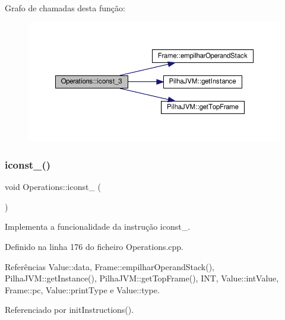 Grafo de chamadas desta função\+:
\nopagebreak
\begin{figure}[H]
\begin{center}
\leavevmode
\includegraphics[width=350pt]{classOperations_ab8466864c000152e75172b623704f610_cgraph}
\end{center}
\end{figure}
\mbox{\label{classOperations_a5fad2dad3d79c889728a6687f36e1192}} 
\subsubsection{\texorpdfstring{iconst\+\_()}{iconst\_4()}}
{\footnotesize\ttfamily void Operations\+::iconst\+\_ (\begin{DoxyParamCaption}{ }\end{DoxyParamCaption})\hspace{0.3cm}{\ttfamily [private]}}



Implementa a funcionalidade da instrução iconst\+\_. 



Definido na linha 176 do ficheiro Operations.\+cpp.



Referências Value\+::data, Frame\+::empilhar\+Operand\+Stack(), Pilha\+J\+V\+M\+::get\+Instance(), Pilha\+J\+V\+M\+::get\+Top\+Frame(), I\+NT, Value\+::int\+Value, Frame\+::pc, Value\+::print\+Type e Value\+::type.



Referenciado por init\+Instructions().

